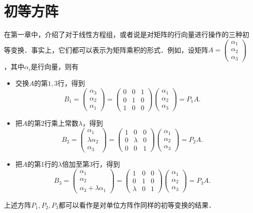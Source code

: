 \documentclass[a4paper,fontset=windows]{ctexbook}
\theoremstyle{definition}
\begin{document}
\clearpage\section{初等方阵}

在第一章中，介绍了对于线性方程组，或者说是对矩阵的行向量进行操作的三种初等变换．事实上，它们都可以表示为矩阵乘积的形式．例如，设矩阵$A=\begin{pmatrix}\alpha_1 \\ \alpha_2 \\ \alpha_3\end{pmatrix}$，其中$\alpha_i$是行向量，则有
\begin{itemize}
\item 交换$A$的第$1,3$行，得到
$$B_1=\begin{pmatrix}\alpha_3 \\ \alpha_2 \\ \alpha_1\end{pmatrix}=\begin{pmatrix}0&0&1 \\ 0&1&0 \\ 1&0&0\end{pmatrix}\begin{pmatrix}\alpha_1 \\ \alpha_2 \\ \alpha_3\end{pmatrix}=P_1A.$$
\item 把$A$的第2行乘上常数$\lambda$，得到
$$B_2=\begin{pmatrix}\alpha_1 \\ \lambda\alpha_2 \\ \alpha_3\end{pmatrix}=\begin{pmatrix}1&0&0 \\ 0&\lambda&0 \\ 0&0&1\end{pmatrix}\begin{pmatrix}\alpha_1 \\ \alpha_2 \\ \alpha_3\end{pmatrix}=P_2A.$$
\item 把$A$的第1行的$\lambda$倍加至第3行，得到
$$B_3=\begin{pmatrix}\alpha_1 \\ \alpha_2 \\ \alpha_3+\lambda\alpha_1\end{pmatrix}=\begin{pmatrix}1&0&0 \\ 0&1&0 \\ \lambda&0&1\end{pmatrix}\begin{pmatrix}\alpha_1 \\ \alpha_2 \\ \alpha_3\end{pmatrix}=P_3A.$$
\end{itemize}
上述方阵$P_1,P_2,P_3$都可以看作是对单位方阵作同样的初等变换的结果．
\end{document}
